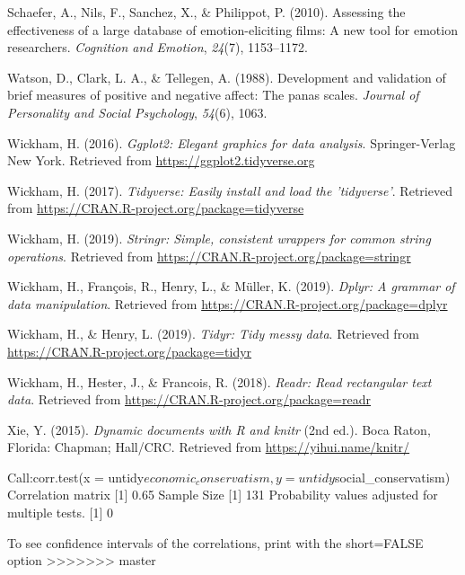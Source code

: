 \documentclass[man]{apa6}
\begin{document}
\leavevmode\hypertarget{ref-schaefer2010}{}%
Schaefer, A., Nils, F., Sanchez, X., \& Philippot, P. (2010). Assessing the effectiveness of a large database of emotion-eliciting films: A new tool for emotion researchers. \emph{Cognition and Emotion}, \emph{24}(7), 1153--1172.

\leavevmode\hypertarget{ref-watson1988development}{}%
Watson, D., Clark, L. A., \& Tellegen, A. (1988). Development and validation of brief measures of positive and negative affect: The panas scales. \emph{Journal of Personality and Social Psychology}, \emph{54}(6), 1063.

\leavevmode\hypertarget{ref-R-ggplot2}{}%
Wickham, H. (2016). \emph{Ggplot2: Elegant graphics for data analysis}. Springer-Verlag New York. Retrieved from \url{https://ggplot2.tidyverse.org}

\leavevmode\hypertarget{ref-R-tidyverse}{}%
Wickham, H. (2017). \emph{Tidyverse: Easily install and load the 'tidyverse'}. Retrieved from \url{https://CRAN.R-project.org/package=tidyverse}

\leavevmode\hypertarget{ref-R-stringr}{}%
Wickham, H. (2019). \emph{Stringr: Simple, consistent wrappers for common string operations}. Retrieved from \url{https://CRAN.R-project.org/package=stringr}

\leavevmode\hypertarget{ref-R-dplyr}{}%
Wickham, H., François, R., Henry, L., \& Müller, K. (2019). \emph{Dplyr: A grammar of data manipulation}. Retrieved from \url{https://CRAN.R-project.org/package=dplyr}

\leavevmode\hypertarget{ref-R-tidyr}{}%
Wickham, H., \& Henry, L. (2019). \emph{Tidyr: Tidy messy data}. Retrieved from \url{https://CRAN.R-project.org/package=tidyr}

\leavevmode\hypertarget{ref-R-readr}{}%
Wickham, H., Hester, J., \& Francois, R. (2018). \emph{Readr: Read rectangular text data}. Retrieved from \url{https://CRAN.R-project.org/package=readr}

\leavevmode\hypertarget{ref-R-knitr}{}%
Xie, Y. (2015). \emph{Dynamic documents with R and knitr} (2nd ed.). Boca Raton, Florida: Chapman; Hall/CRC. Retrieved from \url{https://yihui.name/knitr/}

Call:corr.test(x = untidy\(economic_conservatism, y = untidy\)social\_conservatism)
Correlation matrix
{[}1{]} 0.65
Sample Size
{[}1{]} 131
Probability values adjusted for multiple tests.
{[}1{]} 0

To see confidence intervals of the correlations, print with the short=FALSE option
>>>>>>> master
\end{document}
